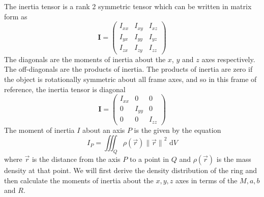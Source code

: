 The inertia tensor is a rank 2 symmetric tensor which can be written in matrix form as
\begin{equation}
    \mathbf{I} = \begin{pmatrix}
        I_{xx} & I_{xy} & I_{xz} \\
        I_{yx} & I_{yy} & I_{yz} \\
        I_{zx} & I_{zy} & I_{zz}
    \end{pmatrix}
\end{equation}
The diagonals are the moments of inertia about the \( x \), \( y \) and \( z \) axes respectively.
The off-diagonals are the products of inertia. The products of inertia are zero if the object is rotationally symmetric about all
frame axes, and so in this frame of reference, the inertia tensor is diagonal
\begin{equation}
    \mathbf{I} = \begin{pmatrix}
        I_{xx} & 0      & 0      \\
        0      & I_{yy} & 0      \\
        0      & 0      & I_{zz}
    \end{pmatrix}
\end{equation}
The moment of inertia \( I \) about an axis \( P \) is the given by the equation
\begin{equation}
    I_P = \iiint_{Q} \rho(\vec{r}) {\lVert\vec{r}\rVert}^{2} \,{}\,{} \mathrm{d}V
\end{equation}
where \( \vec{r} \) is the distance from the axis \( P \) to a point in \( Q \)
and \( \rho(\vec{r}) \) is the mass density at that point.
We will first derive the density distribution of the ring and then calculate the moments of inertia about the \( x,y,z \)
axes in terms of the \( M, a, b \) and \( R \).
